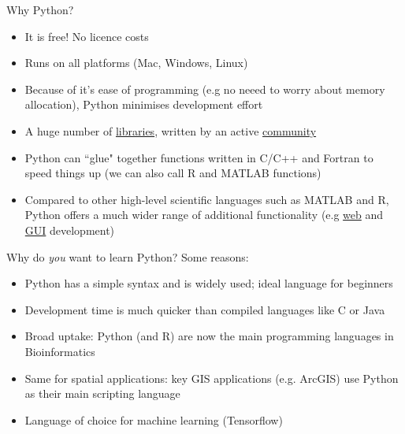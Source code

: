 \documentclass[xcolor=table]{beamer}
\begin{document}
\begin{frame}{Why Python?}

\begin{itemize}\addtolength{\itemsep}{0.5\baselineskip}
	\item<1-> It is free! No licence costs
	\item<2-> Runs on all platforms (Mac, Windows, Linux)
	\item<3-> Because of it's ease of programming (e.g no neeed to worry about memory allocation), Python minimises development effort
	\item<4-> A huge number of \href{https://pypi.python.org/pypi}{libraries}, written by an active \href{https://www.python.org/community/}{community}  
	\item<5-> Python can ``glue" together functions written in C/C++ and Fortran to speed things up (we can also call R and MATLAB functions)
	\item<6-> Compared to other high-level scientific languages such as MATLAB and R, Python offers a much wider range of additional functionality (e.g \href{https://www.djangoproject.com/}{web} and \href{https://wiki.python.org/moin/TkInter}{GUI} development) %
\end{itemize}

\end{frame}


\begin{frame}{Why do \textit{you} want to learn Python?}
    Some reasons:
    \pause
    \begin{itemize}
        \item Python has a simple syntax and is widely used; ideal language for beginners
            \pause
        \item Development time is much quicker than compiled languages like C or Java
            \pause
        \item Broad uptake: Python (and R) are now the main programming languages in Bioinformatics
            \pause
        \item Same for spatial applications: key GIS applications (e.g. ArcGIS) use Python as their main scripting language
        \item Language of choice for machine learning (Tensorflow)
            \pause
    \end{itemize}
\end{frame}
\end{document}
